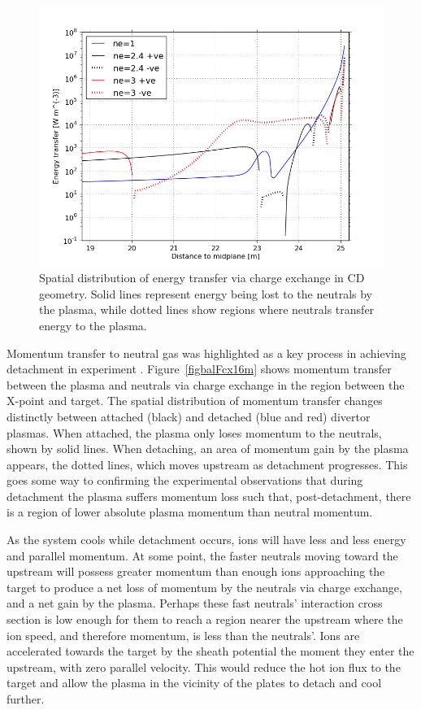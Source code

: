 \documentclass[12pt]{article}  %
\begin{document}
\begin{figure}
\includegraphics[scale=0.5]{Figures/sol1d/balEcx19m.png}
\centering
\caption{Spatial distribution of energy transfer via charge exchange in CD geometry. Solid lines represent energy being lost to the neutrals by the plasma, while dotted lines show regions where neutrals transfer energy to the plasma.}\label{figbalEcx19m}
\end{figure}

Momentum transfer to neutral gas was highlighted as a key process in achieving detachment in experiment \cite{Loarte1998, Wischmeier2009}. Figure~\ref{figbalFcx16m} shows momentum transfer between the plasma and neutrals via charge exchange in the region between the X-point and target. The spatial distribution of momentum transfer changes distinctly between attached (black) and detached (blue and red) divertor plasmas. When attached, the plasma only loses momentum to the neutrals, shown by solid lines. When detaching, an area of momentum gain by the plasma appears, the dotted lines, which moves upstream as detachment progresses. This goes some way to confirming the experimental observations \cite{Loarte1998} that during detachment the plasma suffers momentum loss such that, post-detachment, there is a region of lower absolute plasma momentum than neutral momentum.

As the system cools while detachment occurs, ions will have less and less energy and parallel momentum. At some point, the faster neutrals moving toward the upstream will possess greater momentum than enough ions approaching the target to produce a net loss of momentum by the neutrals via charge exchange, and a net gain by the plasma. Perhaps these fast neutrals' interaction cross section is low enough for them to reach a region nearer the upstream where the ion speed, and therefore momentum, is less than the neutrals'. Ions are accelerated towards the target by the sheath potential the moment they enter the upstream, with zero parallel velocity. This would reduce the hot ion flux to the target and allow the plasma in the vicinity of the plates to detach and cool further. 
\end{document}

